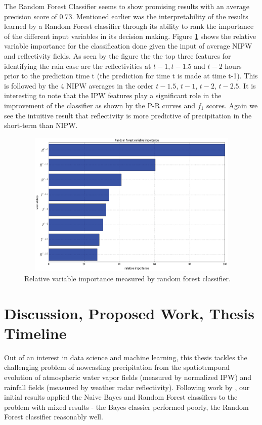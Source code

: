 \documentclass[proposal]{umassthesis}
\begin{document}
The Random Forest Classifier seems to show promising results with an average precision score of 0.73. Mentioned earlier was the interpretability of the results learned by a Random Forest classifier through its ability to rank the importance of the different input variables in its decision making. Figure \ref{fig:variable_importance} shows the relative variable importance for the classification done given the input of average NIPW and reflectivity fields. As seen by the figure the the top three features for identifying the rain case are the reflectivities at $t-1,t-1.5$ and $t-2$ hours prior to the prediction time t (the prediction for time t is made at time t-1). This is followed by the 4 NIPW averages in the order $t-1.5$, $t-1$, $t-2$, $t-2.5$. It is interesting to note that the IPW features play a significant role in the improvement of the classifier as shown by the P-R curves and $f_1$ scores. Again we see the intuitive result that reflectivity is more predictive of precipitation in the short-term than NIPW. 

\begin{figure}[!h]
\begin{center}
\includegraphics[width = 15cm,height = 7cm]{Random_Forest_Feature_Importance.eps}
\caption{Relative variable importance measured by random forest classifier.}\label{fig:variable_importance}
\end{center}
\end{figure}

\chapter{Discussion, Proposed Work, Thesis Timeline}
Out of an interest in data science and machine learning, this thesis tackles the challenging problem of nowcasting precipitation from the spatiotemporal evolution of atmospheric water vapor fields (measured by normalized IPW) and rainfall fields (measured by weather radar reflectivity). Following work by \cite{breiman2001random} \cite{mecikalski2015probabilistic}, our initial results applied the Naive Bayes and Random Forest classifiers to the problem with mixed results - the Bayes classier performed poorly, the Random Forest classifier reasonably well.
\end{document}

